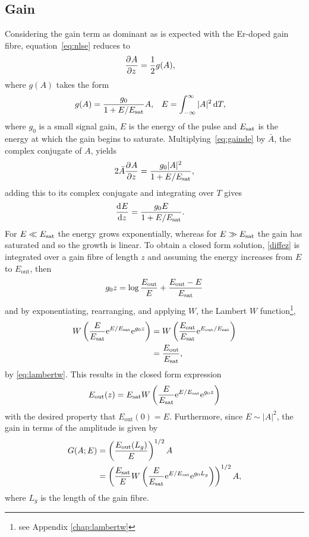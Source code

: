 \subsection{Gain}
Considering the gain term as dominant as is expected with the Er-doped gain fibre, equation~\eqref{eq:nlse} reduces to
\begin{align*}
\frac{\partial^{}A}{\partial{z}^{}} &= \frac{1}{2} g(A),
\end{align*}
where $g(A)$ takes the form \cite{bohun, burgoyne2014, shtyrina, silfvast, yarutkina, peng}
\begin{align}
\label{eq:gainde}
	g(A) &= \frac{g_0}{1 + E / E_{\textrm{sat}}} A,& E &= \int_{-\infty}^\infty |A|^2 \, \textrm{d} T,
\end{align}
where $g_0$ is a small signal gain, $E$ is the energy of the pulse and $E_{\textrm{sat}}$ is the energy at which the gain begins to saturate.
Multiplying~\eqref{eq:gainde} by $\bar{A}$, the complex conjugate of $A$, yields
\begin{align*}
	2\bar{A} \frac{\partial^{}A}{\partial{z}^{}} = \frac{g_0 |A|^2}{1 + E / E_{\textrm{sat}}},
\end{align*}
adding this to its complex conjugate and integrating over $T$ gives
\begin{align}
\label{diffez}
	\frac{\textrm{d}^{}E}{\textrm{d}{z}^{}} &= \frac{g_0 E}{1 + E / E_{\textrm{sat}}}.
\end{align}
For $E \ll E_{\textrm{sat}}$ the energy grows exponentially, whereas for $E \gg E_{\textrm{sat}}$ the gain has saturated and so the growth is linear. To obtain a closed form solution, \eqref{diffez} is integrated over a gain fibre of length $z$ and assuming the energy increases from $E$ to $E_{\textrm{out}}$, then
\[
	g_0 z = \log\frac{E_{\textrm{out}}}{E} + \frac{E_{\textrm{out}}-E}{E_{\textrm{sat}}}
\]
and by exponentiating, rearranging, and applying $W$, the Lambert $W$ function\footnote{see Appendix \ref{chap:lambertw}},
\begin{align*}
W\left(\frac{E}{E_{\textrm{sat}}} \textrm{e}^{E/E_{\textrm{sat}}} \textrm{e}^{g_0 z}\right) &= W\left(\frac{E_{\textrm{out}}}{E_{\textrm{sat}}} \textrm{e}^{E_{\textrm{out}}/E_{\textrm{sat}}}\right) \\
&= \frac{E_{\textrm{out}}}{E_{\textrm{sat}}},
\end{align*}
by \eqref{eq:lambertw}. This results in the closed form expression
\begin{align*}
E_{\textrm{out}}(z) = E_{\textrm{sat}} W \left( \frac{E}{E_{\textrm{sat}}} \textrm{e}^{E/E_{\textrm{sat}}} \textrm{e}^{g_0 z} \right)
\end{align*}
with the desired property that $E_{\textrm{out}}(0)=E$. Furthermore, since $E \sim |A|^2$, the gain in terms of the amplitude is given by
\begin{align*}
G(A;E) &= \left(\frac{E_{\textrm{out}}(L_g)}{E}\right)^{1/2}A \\
&= \left( \frac{E_{\textrm{sat}}}{E} W \left( \frac{E}{E_{\textrm{sat}}} \textrm{e}^{E/E_{\textrm{sat}}} \textrm{e}^{g_0 L_g} \right) \right)^{1/2} A,
\end{align*}
where $L_g$ is the length of the gain fibre.

